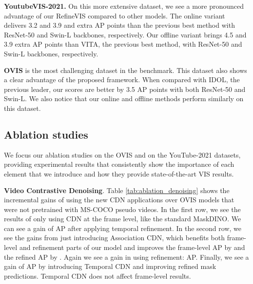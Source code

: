 \textbf{YoutubeVIS-2021.} On this more extensive dataset, we see a more pronounced advantage of our RefineVIS compared to other models. The online variant delivers 3.2 and 3.9 and extra AP points than the previous best method with ResNet-50 and Swin-L backbones, respectively. Our offline variant brings 4.5 and 3.9 extra AP points than VITA, the previous best method, with ResNet-50 and Swin-L backbones, respectively.

\textbf{OVIS} is the most challenging dataset in the benchmark. This dataset also shows a clear advantage of the proposed framework.
When compared with IDOL, the previous leader, our scores are better by 3.5 AP points with both ResNet-50 and Swin-L.
We also notice that our online and offline methods perform similarly on this dataset.




\subsection{Ablation studies}

We focus our ablation studies on the OVIS and on the YouTube-2021 datasets, providing experimental results that consistently show the importance of each element that we introduce and how they provide state-of-the-art VIS results.


\textbf{Video Contrastive Denoising}. Table \ref{tab:ablation_denoising} shows the incremental gains of using the new CDN applications over OVIS models that were not pretrained with MS-COCO pseudo videos.
In the first row, we see the results of only using CDN at the frame level, like the standard MaskDINO.
We can see a gain of  AP after applying temporal refinement.
In the second row, we see the gains from just introducing Association CDN, which benefits both frame-level and refinement parts of our model and improves the frame-level AP by  and the refined AP by .
Again we see a gain in using refinement:  AP.
Finally, we see a gain of  AP by introducing Temporal CDN and improving refined mask predictions.
Temporal CDN does not affect frame-level results.

